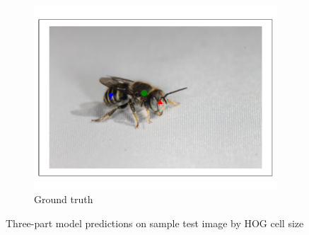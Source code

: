 \documentclass[11pt, oneside]{report}
\begin{document}
\begin{figure}[p]
\begin{subfigure}[b]{0.3\textwidth}
                \includegraphics[width=\textwidth]{hog_gt1.pdf}
                \caption{Ground truth}
            \end{subfigure}

            \hspace{0pt}

            \begin{subfigure}[b]{0.2\textwidth}
                \centering
            \end{subfigure}
            \caption{Three-part model predictions on sample test image by HOG cell size}
            \label{fig:hog_vis1}
        \end{figure}
\end{document}
